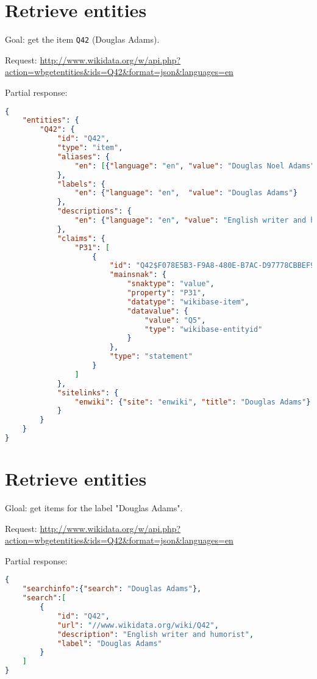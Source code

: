 \label{wikidata:api-examples}
\section{Retrieve entities}

Goal: get the item \texttt{Q42} (Douglas Adams).

Request: \url{http://www.wikidata.org/w/api.php?action=wbgetentities&ids=Q42&format=json&languages=en}

Partial response:
\begin{lstlisting}[language=json]
{
    "entities": {
        "Q42": {
            "id": "Q42",
            "type": "item",
            "aliases": {
                "en": [{"language": "en", "value": "Douglas Noel Adams"}]
            },
            "labels": {
                "en": {"language": "en",  "value": "Douglas Adams"}
            },
            "descriptions": {
                "en": {"language": "en", "value": "English writer and humorist"}
            },
            "claims": {
                "P31": [
                    {
                        "id": "Q42$F078E5B3-F9A8-480E-B7AC-D97778CBBEF9",
                        "mainsnak": {
                            "snaktype": "value",
                            "property": "P31",
                            "datatype": "wikibase-item",
                            "datavalue": {
                                "value": "Q5",
                                "type": "wikibase-entityid"
                            }
                        },
                        "type": "statement"
                    }
                ]
            },
            "sitelinks": {
                "enwiki": {"site": "enwiki", "title": "Douglas Adams"}
            }
        }
    }
}
\end{lstlisting}


\section{Retrieve entities}

Gloal: get items for the label "Douglas Adams".

Request: \url{http://www.wikidata.org/w/api.php?action=wbgetentities&ids=Q42&format=json&languages=en}

Partial response:
\begin{lstlisting}[language=json]
{
    "searchinfo":{"search": "Douglas Adams"},
    "search":[
        {
            "id": "Q42",
            "url": "//www.wikidata.org/wiki/Q42",
            "description": "English writer and humorist",
            "label": "Douglas Adams"
        }
    ]
}
\end{lstlisting}


